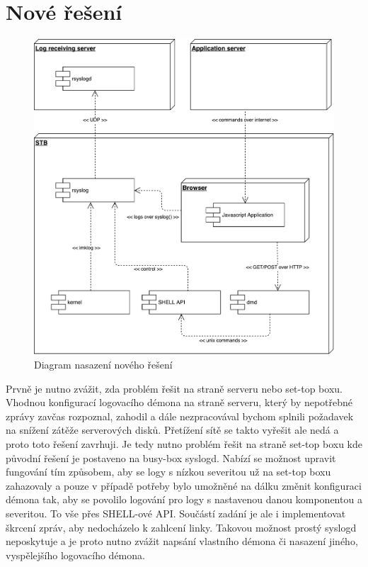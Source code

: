 \documentclass[thesis=B,czech]{FITthesis}[2012/06/26]
\begin{document}
\section{Nové řešení}

\begin{figure}[H]
	\centering
	\includegraphics[scale=0.5]{images/diagram-nasazeni-noveho-reseni}
	\caption[Diagram nasazení nového řešení]{Diagram nasazení nového řešení}
\end{figure}

Prvně je nutno zvážit, zda problém řešit na straně serveru nebo set-top boxu. Vhodnou konfigurací logovacího démona na straně serveru, který by nepotřebné zprávy zavčas rozpoznal, zahodil a dále nezpracovával bychom splnili požadavek na snížení zátěže serverových disků. Přetížení sítě se takto vyřešit ale nedá a proto toto řešení zavrhuji.
Je tedy nutno problém řešit na straně set-top boxu kde původní řešení je postaveno na busy-box syslogd. Nabízí se možnost upravit fungování tím způsobem, aby se logy s nízkou severitou už na set-top boxu zahazovaly a pouze v případě potřeby bylo umožněné na dálku změnit konfiguraci démona tak, aby se povolilo logování pro logy s nastavenou danou komponentou a severitou. To vše přes SHELL-ové API.
Součástí zadání je ale i implementovat škrcení zpráv, aby nedocházelo k zahlcení linky. Takovou možnost prostý syslogd neposkytuje a je proto nutno zvážit napsání vlastního démona či nasazení jiného, vyspělejšího logovacího démona.
\end{document}
